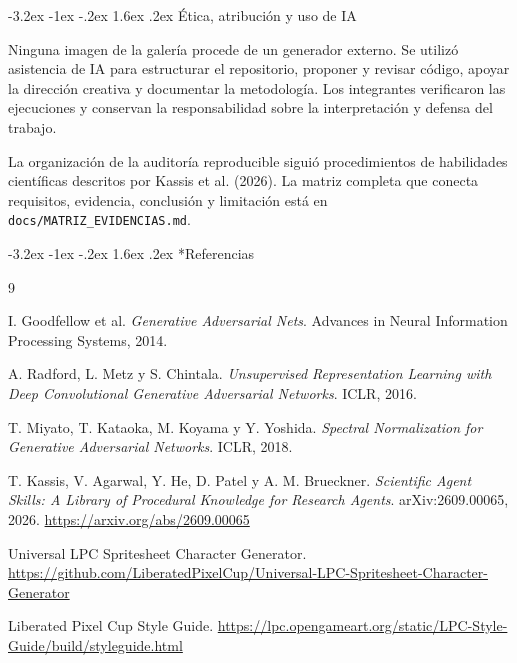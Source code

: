\documentclass[11pt]{article}
\makeatletter
\renewcommand\section{\@startsection{section}{1}{\z@}%
  {-3.2ex \@plus -1ex \@minus -.2ex}%
  {1.6ex \@plus .2ex}%
  {\normalfont\Large\bfseries\color{DeepPurple}}}
\makeatother
\begin{document}
\section{Ética, atribución y uso de IA}

Ninguna imagen de la galería procede de un generador externo. Se utilizó asistencia de IA para estructurar el repositorio, proponer y revisar código, apoyar la dirección creativa y documentar la metodología. Los integrantes verificaron las ejecuciones y conservan la responsabilidad sobre la interpretación y defensa del trabajo.

La organización de la auditoría reproducible siguió procedimientos de habilidades científicas descritos por Kassis et al. (2026). La matriz completa que conecta requisitos, evidencia, conclusión y limitación está en \texttt{docs/MATRIZ\_EVIDENCIAS.md}.

\section*{Referencias}
\begin{thebibliography}{9}

I. Goodfellow et al. \emph{Generative Adversarial Nets}. Advances in Neural Information Processing Systems, 2014.

A. Radford, L. Metz y S. Chintala. \emph{Unsupervised Representation Learning with Deep Convolutional Generative Adversarial Networks}. ICLR, 2016.

T. Miyato, T. Kataoka, M. Koyama y Y. Yoshida. \emph{Spectral Normalization for Generative Adversarial Networks}. ICLR, 2018.

T. Kassis, V. Agarwal, Y. He, D. Patel y A. M. Brueckner. \emph{Scientific Agent Skills: A Library of Procedural Knowledge for Research Agents}. arXiv:2609.00065, 2026. \url{https://arxiv.org/abs/2609.00065}

Universal LPC Spritesheet Character Generator. \url{https://github.com/LiberatedPixelCup/Universal-LPC-Spritesheet-Character-Generator}

Liberated Pixel Cup Style Guide. \url{https://lpc.opengameart.org/static/LPC-Style-Guide/build/styleguide.html}

\end{thebibliography}
\end{document}
